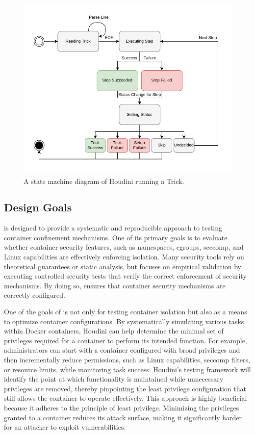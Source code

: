 \begin{figure}[h]
  \label{fig:state-machine}
  \includegraphics[width=1\linewidth]{figs/houdini-state-machine.pdf}
  \caption{A state machine diagram of Houdini running a Trick.}
\end{figure}

\label{sec:design}

\subsection{Design Goals}

\houdini is designed to provide a systematic and reproducible approach to testing container confinement mechanisms. One of its primary goals is to evaluate whether container security features, such as namespaces, cgroups, seccomp, and Linux capabilities are effectively enforcing isolation. Many security tools rely on theoretical guarantees or static analysis, but \houdini focuses on empirical validation by executing controlled security tests that verify the correct enforcement of security mechanisms. By doing so, \houdini ensures that container security mechanisms are correctly configured.

One of the goals of \houdini is not only for testing container isolation but also as a means to optimize container configurations. By systematically simulating various tasks within Docker containers, Houdini can help determine the minimal set of privileges required for a container to perform its intended function. For example, administrators can start with a container configured with broad privileges and then incrementally reduce permissions, such as Linux capabilities, seccomp filters, or resource limits, while monitoring task success. Houdini’s testing framework will identify the point at which functionality is maintained while unnecessary privileges are removed, thereby pinpointing the least privilege configuration that still allows the container to operate effectively. This approach is highly beneficial because it adheres to the principle of least privilege. Minimizing the privileges granted to a container reduces its attack surface, making it significantly harder for an attacker to exploit vulnerabilities.

